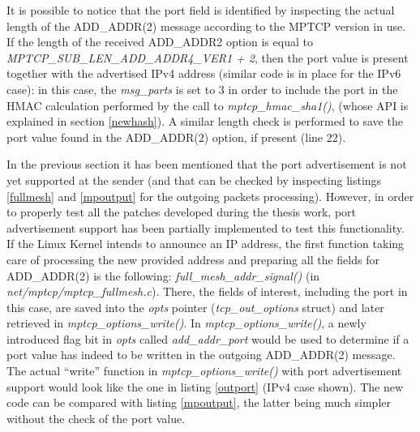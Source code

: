 It is possible to notice that the port field is identified by inspecting the actual length of the ADD\_ADDR(2) message according to the MPTCP version in use. If the length of the received ADD\_ADDR2 option is equal to \textit{MPTCP\_SUB\_LEN\_ADD\_ADDR4\_VER1 + 2}, then the port value is present together with the advertised IPv4 address (similar code is in place for the IPv6 case): in this case, the \textit{msg\_parts} is set to 3 in order to include the port in the HMAC calculation performed by the call to \textit{mptcp\_hmac\_sha1()}, (whose API is explained in section \ref{newhash}). A similar length check is performed to save the port value found in the ADD\_ADDR(2) option, if present (line 22). 

In the previous section it has been mentioned that the port advertisement is not yet supported at the sender (and that can be checked by inspecting listings \ref{fullmesh} and \ref{mpoutput} for the outgoing packets processing). 
However, in order to properly test all the patches developed during the thesis work, port advertisement support has been partially implemented to test this functionality. If the Linux Kernel intends to announce an IP address, the first function taking care of processing the new provided address and preparing all the fields for ADD\_ADDR(2) is the following: \textit{full\_mesh\_addr\_signal()} (in \textit{net/mptcp/mptcp\_fullmesh.c}). There, the fields of interest, including the port in this case, are saved into the \textit{opts} pointer (\textit{tcp\_out\_options} struct) and later retrieved in \textit{mptcp\_options\_write()}. In \textit{mptcp\_options\_write()}, a newly introduced flag bit in \textit{opts} called \textit{add\_addr\_port} would be used to determine if a port value has indeed to be written in the outgoing ADD\_ADDR(2) message. The actual ``write'' function in \textit{mptcp\_options\_write()} with port advertisement support would look like the one in listing \ref{outport} (IPv4 case shown). The new code can be compared with listing \ref{mpoutput}, the latter being much simpler without the check of the port value.

